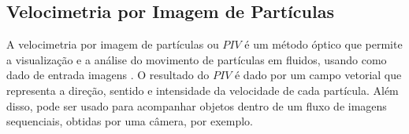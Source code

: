 \subsection{Velocimetria por Imagem de Partículas}

A velocimetria por imagem de partículas ou $PIV$ 
é um método óptico que permite a visualização e a análise do movimento de partículas em fluidos, 
usando como dado de entrada imagens \cite{Bastiaans}.
O resultado do $PIV$ é dado por um campo vetorial que representa a direção, sentido e intensidade da velocidade de cada 
partícula. Além disso, pode ser usado para acompanhar objetos dentro de um fluxo de imagens sequenciais, 
obtidas por uma câmera, por exemplo.

